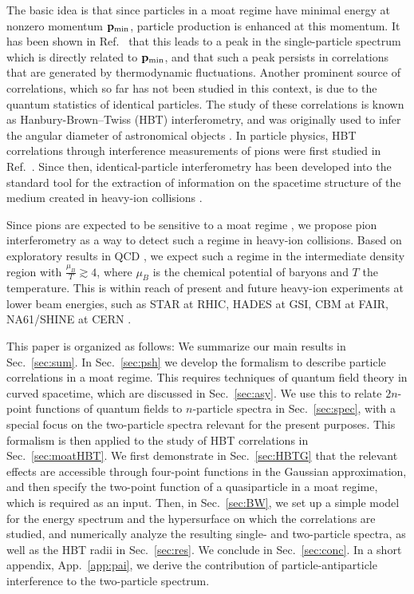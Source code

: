 \documentclass[reprint,superscriptaddress,english,preprintnumbers,amsmath,amssymb,aps,prx]{revtex4-2}
\def\Sec#1{Sec.~\ref{#1}}
\def\App#1{App.~\ref{#1}}
\begin{document}
The basic idea is that since particles in a moat regime have minimal energy at nonzero momentum $\bold{p}_{\rm min}$, particle production is enhanced at this momentum. It has been shown in Ref.\ \cite{Pisarski:2021qof} that this leads to a peak in the single-particle spectrum which is directly related to $\bold{p}_{\rm min}$, and that such a peak persists in correlations that are generated by thermodynamic fluctuations. Another prominent source of correlations, which so far has not been studied in this context, is due to the quantum statistics of identical particles. The study of these correlations is known as Hanbury-Brown--Twiss (HBT) interferometry, and was originally used to infer the angular diameter of astronomical objects \cite{HanburyBrown:1956bqd}. In particle physics, HBT correlations through interference measurements of pions were first studied in Ref.\ \cite{Goldhaber:1960sf}. Since then, identical-particle interferometry has been developed into the standard tool for the extraction of information on the spacetime structure of the medium created in heavy-ion collisions \cite{Heinz:1996bs, Heinz:1999rw, Wiedemann:1999qn, Weiner:1999th, Lisa:2005dd}.

Since pions are expected to be sensitive to a moat regime \cite{Fu:2019hdw, Pisarski:2020gkx}, we propose pion interferometry as a way to detect such a regime in heavy-ion collisions. Based on exploratory results in QCD \cite{Fu:2019hdw}, we expect such a regime in the intermediate density region with $\frac{\mu_B}{T}\gtrsim 4$, where $\mu_B$ is the chemical potential of baryons and $T$ the temperature. This is within reach of present and future heavy-ion experiments at lower beam energies, such as STAR at RHIC, HADES at GSI, CBM at FAIR, NA61/SHINE at CERN \cite{CBM:2016kpk,Bzdak:2019pkr,Almaalol:2022xwv}. 

This paper is organized as follows: We summarize our main results in \Sec{sec:sum}. In \Sec{sec:psh} we develop the formalism to describe particle correlations in a moat regime. This requires techniques of quantum field theory in curved spacetime, which are discussed in \Sec{sec:asy}. We use this to relate $2n$-point functions of quantum fields to $n$-particle spectra in \Sec{sec:spec}, with a special focus on the two-particle spectra relevant for the present purposes. This formalism is then applied to the study of HBT correlations in \Sec{sec:moatHBT}. We first demonstrate in \Sec{sec:HBTG} that the relevant effects are accessible through four-point functions in the Gaussian approximation, and then specify the two-point function of a quasiparticle in a moat regime, which is required as an input. Then,  in \Sec{sec:BW}, we set up a simple model for the energy spectrum and the hypersurface on which the correlations are studied, and numerically analyze the resulting single- and two-particle spectra, as well as the HBT radii in \Sec{sec:res}. We conclude in \Sec{sec:conc}. In a short appendix, \App{app:pai}, we derive the contribution of particle-antiparticle interference to the two-particle spectrum.
\end{document}
